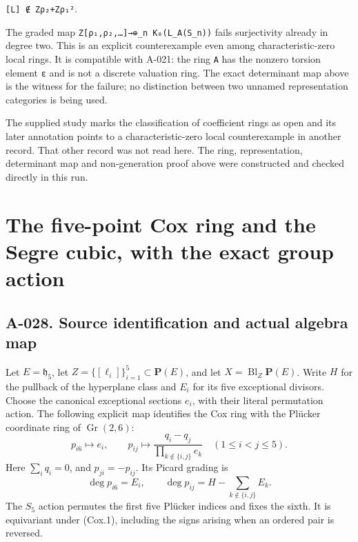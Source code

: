 \documentclass[
  10pt,
]{article}
\begin{document}
\texttt{\small [\allowbreak{}L]\allowbreak{} ∉ Zρ₂+\allowbreak{}Zρ₁²}.

The graded map
\texttt{\small Z[\allowbreak{}ρ₁,\allowbreak{}ρ₂,\allowbreak{}…]\allowbreak{}→\allowbreak{}⊕\allowbreak{}\_\allowbreak{}n K₀(\allowbreak{}L\_\allowbreak{}A(\allowbreak{}S\_\allowbreak{}n)\allowbreak{})\allowbreak{}}
fails surjectivity already in degree two. This is an explicit
counterexample even among characteristic-zero local rings. It is
compatible with A-021: the ring \texttt{\small A} has the nonzero
torsion element \texttt{\small ε} and is not a discrete valuation ring.
The exact determinant map above is the witness for the failure; no
distinction between two unnamed representation categories is being used.

The supplied study marks the classification of coefficient rings as open
and its later annotation points to a characteristic-zero local
counterexample in another record. That other record was not read here.
The ring, representation, determinant map and non-generation proof above
were constructed and checked directly in this run.

\section{The five-point Cox ring and the Segre cubic, with the exact
group
action}\label{the-five-point-cox-ring-and-the-segre-cubic-with-the-exact-group-action}

\subsection{A-028. Source identification and actual algebra
map}\label{a-028.-source-identification-and-actual-algebra-map}

Let \(E=\mathfrak h_5\), let
\(Z=\{[\ell_i]\}_{i=1}^5\subset\mathbf P(E)\), and let
\(X=\operatorname{Bl}_Z\mathbf P(E)\). Write \(H\) for the pullback of
the hyperplane class and \(E_i\) for its five exceptional divisors.
Choose the canonical exceptional sections \(e_i\), with their literal
permutation action. The following explicit map identifies the Cox ring
with the Plücker coordinate ring of \(\operatorname{Gr}(2,6)\): \[
\boxed{
p_{i6}\longmapsto e_i,\qquad
p_{ij}\longmapsto
\frac{q_i-q_j}{\prod_{k\notin\{i,j\}}e_k}
\quad(1\le i<j\le5).
}
\tag{Cox.1}
\] Here \(\sum_iq_i=0\), and \(p_{ji}=-p_{ij}\). Its Picard grading is
\[
\deg p_{i6}=E_i,\qquad
\deg p_{ij}=H-\sum_{k\notin\{i,j\}}E_k.
\tag{Cox.2}
\] The \(S_5\) action permutes the first five Plücker indices and fixes
the sixth. It is equivariant under (Cox.1), including the signs arising
when an ordered pair is reversed.
\end{document}
